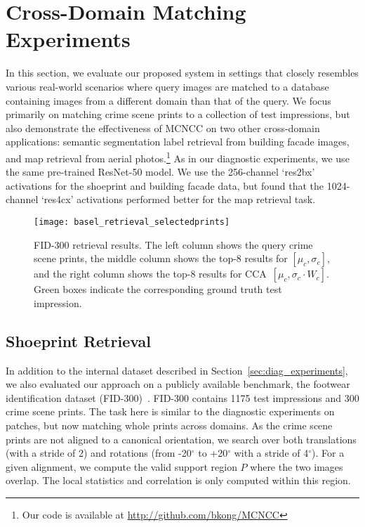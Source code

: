 \documentclass[twocolumn]{svjour3}           %
\begin{document}
\section{Cross-Domain Matching Experiments}
In this section, we evaluate our proposed system in settings that closely
resembles various real-world scenarios where query images are matched to a
database containing images from a different domain than that of the query.
We focus primarily on matching crime scene prints to a collection of test
impressions, but also demonstrate the effectiveness of MCNCC on two other
cross-domain applications: semantic segmentation label retrieval from building
facade images, and map retrieval from aerial photos.\footnote{Our code is
available at \url{http://github.com/bkong/MCNCC}} As in our diagnostic
experiments, we use the same pre-trained ResNet-50 model.  We use the
256-channel `res2bx' activations for the shoeprint and building facade data,
but found that the 1024-channel `res4cx' activations performed better
for the map retrieval task.

\begin{figure*}[t]
\begin{center}
  \texttt{[image: basel\_retrieval\_selectedprints]}
  \vspace{-2mm}
\end{center}
\caption{FID-300 retrieval results. The left column shows the query crime scene
  prints, the middle column shows the top-8 results for $[\mu_c,\sigma_c]$, and
  the right column shows the top-8 results for CCA~$[\mu_c,\sigma_c\cdot W_c]$.
  Green boxes indicate the corresponding ground truth test impression.}
\label{fig:basel_retrieval}
\end{figure*}

\subsection{Shoeprint Retrieval}
In addition to the internal dataset described in
Section~\ref{sec:diag_experiments}, we also evaluated our approach on a
publicly available benchmark, the footwear identification dataset
(FID-300)~\cite{kortylewski2014unsupervised}.  FID-300 contains 1175 test
impressions and 300 crime scene prints.  The task here is similar to the
diagnostic experiments on patches, but now matching whole prints across
domains.  As the crime scene prints are not aligned to a canonical orientation,
we search over both translations (with a stride of 2) and rotations (from
-20$^\circ$ to +20$^\circ$ with a stride of 4$^\circ$). For a given alignment,
we compute the valid support region $P$ where the two images overlap. The local
statistics and correlation is only computed within this region.
\end{document}
